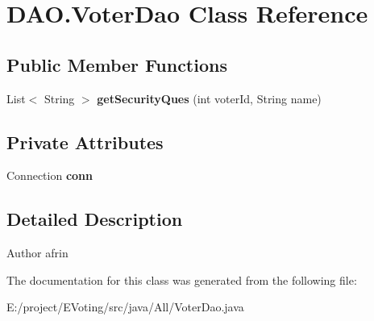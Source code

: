 \hypertarget{class_d_a_o_1_1_voter_dao}{}\section{D\+A\+O.\+Voter\+Dao Class Reference}
\label{class_d_a_o_1_1_voter_dao}
\subsection*{Public Member Functions}
\begin{DoxyCompactItemize}
\item 
\mbox{\label{class_d_a_o_1_1_voter_dao_a7850edb5b7f5466aef0d813731b0016c}} 
List$<$ String $>$ {\bfseries get\+Security\+Ques} (int voter\+Id, String name)
\end{DoxyCompactItemize}
\subsection*{Private Attributes}
\begin{DoxyCompactItemize}
\item 
\mbox{\label{class_d_a_o_1_1_voter_dao_a0a7a42dd93c1c2a055658e3defc7b63a}} 
Connection {\bfseries conn}
\end{DoxyCompactItemize}


\subsection{Detailed Description}
\begin{DoxyAuthor}{Author}
afrin 
\end{DoxyAuthor}


The documentation for this class was generated from the following file\+:\begin{DoxyCompactItemize}
\item 
E\+:/project/\+E\+Voting/src/java/\+All/Voter\+Dao.\+java\end{DoxyCompactItemize}
